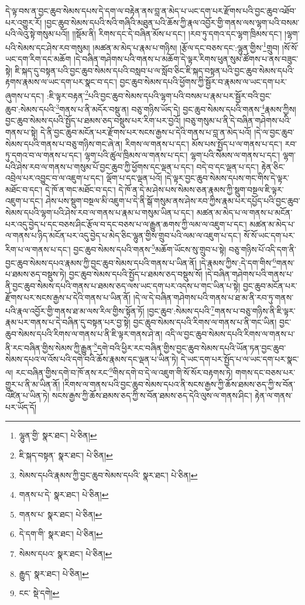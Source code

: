 དེ་ལྟ་བས་ན་བྱང་ཆུབ་སེམས་དཔས་དེ་དག་ལ་བརྟེན་ནས་བླ་ན་མེད་པ་ཡང་དག་པར་རྫོགས་པའི་བྱང་ཆུབ་འཐོབ་པར་འགྱུར་རོ། །བྱང་ཆུབ་སེམས་དཔའི་སའི་གཞིའི་མཐུན་པའི་ཆོས་ཀྱི་རྣལ་འབྱོར་གྱི་གནས་ལས་ལྷག་པའི་བསམ་པའི་ལེའུ་སྟེ་གསུམ་པའོ།། །།སྡོམ་ནི། རིགས་དང་དེ་བཞིན་མོས་པ་དང་། །རབ་ཏུ་དགའ་དང་ལྷག་ཁྲིམས་དང་། །ལྷག་པའི་སེམས་དང་ཤེས་རབ་གསུམ། །མཚན་མ་མེད་པ་རྣམ་པ་གཉིས། །རྩོལ་དང་བཅས་དང་:ལྷུན་གྱིས་\footnote{ལྷུན་གྱི་  སྣར་ཐང་།  པེ་ཅིན། }གྲུབ། །སོ་སོ་ཡང་དག་རིག་དང་མཆོག །དེ་བཞིན་གཤེགས་པའི་གནས་པ་མཆོག་དེ་ལྟར་རིགས་ཕུན་སུམ་ཚོགས་པ་ནས་བཟུང་སྟེ། ཇི་སྐད་དུ་བསྟན་པའི་བྱང་ཆུབ་སེམས་དཔའི་བསླབ་པ་ལ་སློབ་ཅིང་ཇི་སྐད་བསྟན་པའི་བྱང་ཆུབ་སེམས་དཔའི་རྟགས་རྣམས་ལ་ཡང་དག་པར་སྣང་བ་དང་། བྱང་ཆུབ་སེམས་དཔའི་ཕྱོགས་ཀྱི་སྦྱོར་བ་རྣམས་ལ་ཡང་དག་པར་ཞུགས་པ་དང་། :ཇི་ལྟར་བརྟན་\footnote{ཇི་སྐད་བསྟན་  སྣར་ཐང་།  པེ་ཅིན། }པའི་བྱང་ཆུབ་སེམས་དཔའི་ལྷག་པའི་བསམ་པ་རྣམ་པར་སྦྱོར་བའི་བྱང་ཆུབ་:སེམས་དཔའི་\footnote{སེམས་དཔའི་རྣམས་ཀྱི་བྱང་ཆུབ་སེམས་དཔའི་  སྣར་ཐང་།  པེ་ཅིན། }གནས་པ་ནི་མདོར་བསྡུ་ན། བཅུ་གཉིས་ཡོད་དེ། བྱང་ཆུབ་སེམས་དཔའི་གནས་\footnote{གནས་པ་དེ་  སྣར་ཐང་།  པེ་ཅིན། }རྣམས་ཀྱིས། བྱང་ཆུབ་སེམས་དཔའི་སྤྱོད་པ་ཐམས་ཅད་བསྡུས་པར་རིག་པར་བྱའོ། །བཅུ་གསུམ་པ་ནི་དེ་བཞིན་གཤེགས་པའི་གནས་པ་སྟེ། དེ་ནི་བྱང་ཆུབ་མངོན་པར་རྫོགས་པར་སངས་རྒྱས་པ་དེའི་གནས་པ་བླ་ན་མེད་པའོ། །དེ་ལ་བྱང་ཆུབ་སེམས་དཔའི་གནས་པ་བཅུ་གཉིས་གང་ཞེ་ན། རིགས་ལ་གནས་པ་དང་། མོས་པས་སྤྱོད་པ་ལ་གནས་པ་དང་། རབ་ཏུ་དགའ་བ་ལ་གནས་པ་དང་། ལྷག་པའི་ཚུལ་ཁྲིམས་ལ་གནས་པ་དང་། ལྷག་པའི་སེམས་ལ་གནས་པ་དང་། ལྷག་པའི་ཤེས་རབ་ལ་གནས་པ་གསུམ་པོ་བྱང་ཆུབ་ཀྱི་ཕྱོགས་དང་ལྡན་པ་དང་། བདེ་བ་དང་ལྡན་པ་དང་། རྟེན་ཅིང་འབྲེལ་པར་འབྱུང་བ་ལ་འཇུག་པ་དང་། ལྡོག་པ་དང་ལྡན་པའོ། །དེ་ལྟར་བྱང་ཆུབ་སེམས་དཔས་གང་གིས་དེ་ལྟར་མཐོང་བ་དང་། དེ་ཁོ་ན་གང་མཐོང་བ་དང་། དེ་ཁོ་ན་དེ་མ་ཤེས་པས་སེམས་ཅན་རྣམས་ཀྱི་སྡུག་བསྔལ་ཇི་ལྟར་འཇུག་པ་དང་། ཤེས་པས་སྡུག་བསྔལ་མི་འཇུག་པ་དེ་ནི་སྒོ་གསུམ་ནས་ཤེས་རབ་ཀྱིས་རྣམ་པར་དཔྱོད་པའི་བྱང་ཆུབ་སེམས་དཔའི་ལྷག་པའི་ཤེས་རབ་ལ་གནས་པ་རྣམ་པ་གསུམ་ཡིན་པ་དང་། མཚན་མ་མེད་པ་ལ་གནས་པ་མངོན་པར་འདུ་བྱེད་པ་དང་བཅས་ཤིང་རྩོལ་བ་དང་བཅས་པ་ལ་རྒྱུན་ཆགས་ཀྱི་ལམ་ལ་འཇུག་པ་དང་། མཚན་མ་མེད་པ་ལ་གནས་པ་ཉིད་མངོན་པར་འདུ་བྱེད་པ་མེད་ཅིང་ལྷུན་གྱིས་གྲུབ་པའི་ལམ་ལ་འཇུག་པ་དང་། སོ་སོ་ཡང་དག་པར་རིག་པ་ལ་གནས་པ་དང་། བྱང་ཆུབ་སེམས་དཔའི་གནས་\footnote{གནས་པ་  སྣར་ཐང་།  པེ་ཅིན། }མཆོག་ཡོངས་སུ་གྲུབ་པ་སྟེ། བཅུ་གཉིས་པོ་འདི་དག་ནི་བྱང་ཆུབ་སེམས་དཔའ་རྣམས་ཀྱི་བྱང་ཆུབ་སེམས་དཔའི་གནས་པ་ཡིན་ནོ། །དེ་རྣམས་ཀྱིས་:དེ་དག་གིས་\footnote{དེ་དག་གི་  སྣར་ཐང་།  པེ་ཅིན། }གནས་པ་ཐམས་ཅད་བསྡུས་ཏེ། བྱང་ཆུབ་སེམས་དཔའི་སྤྱོད་པ་ཐམས་ཅད་བསྡུས་སོ། །དེ་བཞིན་གཤེགས་པའི་གནས་པ་ནི་བྱང་ཆུབ་སེམས་དཔའི་གནས་པ་ཐམས་ཅད་ལས་ཡང་དག་པར་འདས་པ་གང་ཡིན་པ་སྟེ། བྱང་ཆུབ་མངོན་པར་རྫོགས་པར་སངས་རྒྱས་པ་དེའི་གནས་པ་ཡིན་ནོ། །དེ་ལ་དེ་བཞིན་གཤེགས་པའི་གནས་པ་ཐ་མ་ནི་རབ་ཏུ་གནས་པའི་རྣལ་འབྱོར་གྱི་གནས་ཐ་མ་ལས་རིལ་གྱིས་སྟོན་ཏོ། །བྱང་ཆུབ་:སེམས་དཔའི་\footnote{སེམས་དཔའ་  སྣར་ཐང་།  པེ་ཅིན། }གནས་པ་བཅུ་གཉིས་ནི་ཇི་ལྟར་རྣམ་པར་གནས་པ་དེ་བཞིན་དུ་བསྟན་པར་བྱ་སྟེ། བྱང་ཆུབ་སེམས་དཔའི་རིགས་ལ་གནས་པ་ནི་གང་ཡིན། བྱང་ཆུབ་སེམས་དཔའི་རིགས་ལ་གནས་པ་ནི་ཇི་ལྟར་གནས་ཤེ་ན། འདི་ལ་བྱང་ཆུབ་སེམས་དཔའི་རིགས་ལ་གནས་པ་ནི་རང་བཞིན་གྱིས་སེམས་ཀྱི་རྒྱུན་\footnote{རྒྱུད་  སྣར་ཐང་།  པེ་ཅིན། }དགེ་བའི་ཕྱིར་རང་བཞིན་གྱིས་བྱང་ཆུབ་སེམས་དཔའི་ཡོན་ཏན་བྱང་ཆུབ་སེམས་དཔའ་ལ་འོས་པའི་དགེ་བའི་ཆོས་རྣམས་དང་ལྡན་པ་ཡིན་ཏེ། དེ་ཡང་དག་པར་སྤྱོད་པ་ལ་ཡང་དག་པར་སྣང་ལ། རང་བཞིན་གྱིས་དགེ་བ་ཁོ་ནས་རང་\footnote{ངང་  སྡེ་དགེ། }གིས་དགེ་བ་དེ་ལ་འཇུག་གི་སོ་སོར་བརྟགས་ཏེ། གགས་དང་བཅས་པར་གྱུར་པ་ནི་མ་ཡིན་ནོ། །རིགས་ལ་གནས་པའི་བྱང་ཆུབ་སེམས་དཔའ་ནི་སངས་རྒྱས་ཀྱི་ཆོས་ཐམས་ཅད་ཀྱི་ས་བོན་འཛིན་པ་ཡིན་ཏེ། སངས་རྒྱས་ཀྱི་ཆོས་ཐམས་ཅད་ཀྱི་ས་བོན་ཐམས་ཅད་དེའི་ལུས་ལ་གནས་ཤིང་། རྟེན་ལ་གནས་པར་ཡོད་དོ། 